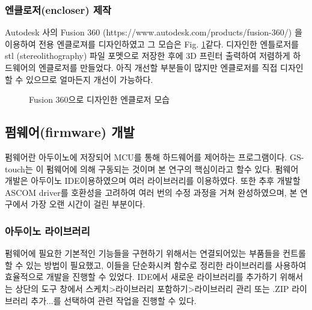 \subsubsection{엔클로저(encloser) 제작}

Autodesk 사의 Fusion 360 (https://www.autodesk.com/products/fusion-360/) 을 이용하여 전용 엔클로져를 디자인하였고 그 모습은 Fig. \ref{fig:stl}\와 같다. 디자인한 엔틀로저를 stl (stereolithography) 파일 포멧으로 저장한 후에 3D 프린터 출력하여 저렴하게 하드웨어의 엔클로저를 만들었다. 아직 개선할 부분들이 많지만 엔클로저를 직접 디자인 할 수 있으므로 얼마든지 개선이 가능하다. 

\begin{figure}[h]
	\begin{center}
			\caption{Fusion 360으로 디자인한 엔클로저 모습}
		\label{fig:stl}
	\end{center}
\end{figure}

\clearpage

\subsection{펌웨어(firmware) 개발}

펌웨어란 아두이노에 저장되어 MCU를 통해 하드웨어를 제어하는 프로그램이다. GS-touch는 이 펌웨어에 의해 구동되는 것이며 본 연구의 핵심이라고 할수 있다. 펌웨어 개발은 아두이노 IDE\를 이용하였으며 여러 라이브러리를 이용하였다. 또한 추후 개발할 ASCOM driver를 호환성을 고려하여 여러 번의 수정 과정을 거쳐 완성하였으며, 본 연구에서 가장 오랜 시간이 걸린 부분이다. 

\subsubsection{아두이노 라이브러리}
펌웨어에 필요한 기본적인 기능들을 구현하기 위해서는 연결되어있는 부품들을 컨트롤할 수 있는 방법이 필요했고, 이들을 단순화시켜 함수로 정리한 라이브러리를 사용하여 효율적으로 개발을 진행할 수 있었다.
IDE에서 새로운 라이브러리를 추가하기 위해서는 상단의 도구 창에서 스케치>라이브러리 포함하기>라이브러리 관리 또는 .ZIP 라이브러리 추가...를 선택하여 관련 작업을 진행할 수 있다.

